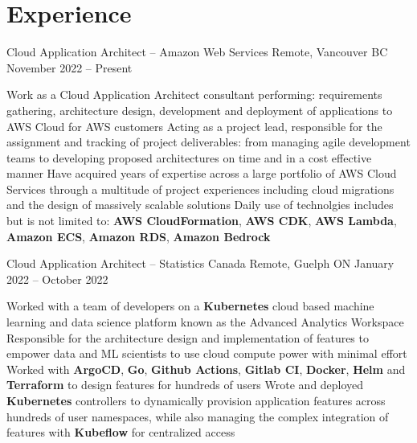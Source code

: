 \section{Experience}
\begin{subheading}

	\resumeExp
	{Cloud Application Architect -- Amazon Web Services}
	{Remote, Vancouver BC}
	{November 2022 -- Present}
	{}
	\begin{entries}
        \ib Work as a Cloud Application Architect consultant performing: requirements gathering, architecture
        design, development and deployment of applications to AWS Cloud for AWS customers
        \ib Acting as a project lead, responsible for the assignment and tracking
        of project deliverables: from managing agile development teams to developing
        proposed architectures on time and in a cost effective manner
        \ib Have acquired years of expertise across a large portfolio of AWS Cloud Services
        through a multitude of project experiences including cloud migrations and the design
        of massively scalable solutions
        \ib Daily use of technolgies includes but is not limited to: \textbf{AWS CloudFormation}, 
        \textbf{AWS CDK}, \textbf{AWS Lambda}, \textbf{Amazon ECS}, \textbf{Amazon RDS}, \textbf{Amazon Bedrock}
    \end{entries}

	\resumeExp
	{Cloud Application Architect -- Statistics Canada}
	{Remote, Guelph ON}
	{January 2022 -- October 2022}
	{}
	\begin{entries}
		\ib Worked with a team of developers on a \textbf{Kubernetes} cloud based machine learning and data science
		platform known as the Advanced Analytics Workspace
		\href{https://analytics-platform.statcan.gc.ca/covid19}{\footnotesize{\faExternalLink}}
		\ib Responsible for the architecture design and implementation of features to  empower data and ML scientists to
		use cloud compute power with  minimal effort
		\ib Worked with \textbf{ArgoCD}, \textbf{Go}, \textbf{Github Actions}, \textbf{Gitlab CI}, \textbf{Docker}, \textbf{Helm} and
		\textbf{Terraform} to design features for hundreds of users
		\ib Wrote and deployed \textbf{Kubernetes} controllers to dynamically provision application
		features across hundreds of user namespaces, while
		also managing the complex integration of features with \textbf{Kubeflow} for centralized access
	\end{entries}


\end{subheading}
